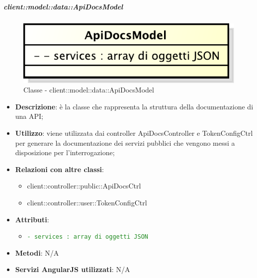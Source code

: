 		\subparagraph{client::model::data::ApiDocsModel} %
		\label{subp:client_model_data_apidocsmodel}
			\begin{figure}[htbp]
				\centering
				\centerline{\includegraphics[scale=0.7]{./images/client/classes/model/api_docs_model.pdf}}
				\caption{Classe - client::model::data::ApiDocsModel}
			\end{figure}
			\begin{itemize}
				\item \textbf{Descrizione}: è la classe che rappresenta la struttura della documentazione di una API;
				\item \textbf{Utilizzo}: viene utilizzata dai controller ApiDocsController e TokenConfigCtrl per generare la documentazione dei servizi pubblici che vengono messi a disposizione per l'interrogazione;
				\item \textbf{Relazioni con altre classi}:
					\begin{itemize}
						\item client::controller::public::ApiDocsCtrl
						\item client::controller::user::TokenConfigCtrl
					\end{itemize}
				\item \textbf{Attributi}:
					\begin{itemize}
						\item \textcolor{forestgreen}{\texttt{- services : array di oggetti JSON}}
					\end{itemize}

				\item \textbf{Metodi}: N/A

				\item \textbf{Servizi AngularJS utilizzati}: N/A

			\end{itemize}


